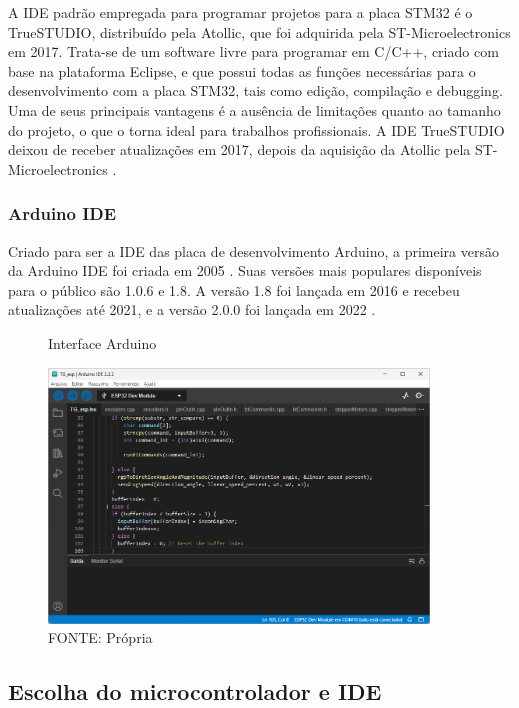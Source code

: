 A IDE padrão empregada para programar projetos para a placa STM32 é o TrueSTUDIO,
distribuído pela Atollic, que foi adquirida pela ST-Microelectronics em 2017.
Trata-se de um software livre para programar em C/C++, criado com base na
plataforma Eclipse, e que possui todas as funções necessárias para o
desenvolvimento com a placa STM32, tais como edição, compilação e debugging.
Uma de seus principais vantagens é a ausência de limitações quanto ao tamanho
do projeto, o que o torna ideal para trabalhos profissionais. A IDE TrueSTUDIO
deixou de receber atualizações em 2017, depois da aquisição da Atollic pela 
ST-Microelectronics \cite{apostila_microprossados}.


\subsubsection{Arduino IDE}

Criado para ser a IDE das placa de desenvolvimento Arduino, a primeira
versão da Arduino IDE foi criada em 2005 \cite{arduino_id_history}.
Suas versões mais populares disponíveis para o público são 1.0.6 e 1.8. 
A versão 1.8 foi lançada em 2016 e recebeu atualizações até 2021, 
e a versão 2.0.0 foi lançada em 2022 \cite{arduino_tag_2}.

\begin{figure}[ht]
	\centering
	\caption{Interface Arduino}
	\includegraphics[width=0.9\textwidth]{figures/arduino}
	\caption*{FONTE: Própria}
\end{figure}

\subsection{Escolha do microcontrolador e IDE}

